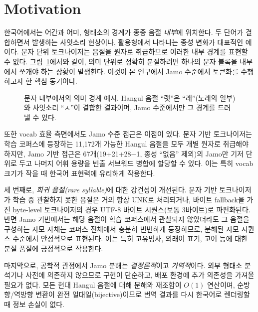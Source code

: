 \documentclass[sigconf,nonacm]{acmart}
\begin{document}
\section{Motivation}
\label{sec:motivation}

한국어에서는 어간과 어미, 형태소의 경계가 종종 음절 \emph{내부}에 위치한다. 두 단어가 결합하면서
발생하는 사잇소리 현상이나, 활용형에서 나타나는 종성 변화가 대표적인 예이다. 문자 단위
토크나이저는 음절을 원자로 취급하므로 이러한 내부 경계를 표현할 수 없다.
그림~\ref{fig:meaning_split}에서와 같이, 의미 단위로 정확히 분절하려면 하나의 문자 블록을
내부에서 쪼개야 하는 상황이 발생한다. 이것이 본 연구에서 Jamo 수준에서 토큰화를 수행하고자 한
핵심 동기이다.

\begin{figure}[h]
\centering
{}
\caption{문자 내부에서의 의미 경계 예시. Hangul 음절 ``랫''은 ``래''(노래의 일부)와 사잇소리 ``ㅅ''이
결합한 결과이며, Jamo 수준에서만 그 경계를 드러낼 수 있다.}
\label{fig:meaning_split}
\end{figure}

또한 vocab 효율 측면에서도 Jamo 수준 접근은 이점이 있다. 문자 기반 토크나이저는 학습 코퍼스에
등장하는 11,172개 가능한 Hangul 음절을 모두 개별 원자로 취급해야 하지만, Jamo 기반 접근은
67개(19+21+28$-$1, 종성 ``없음'' 제외)의 Jamo만 기저 단위로 두고 나머지 어휘 용량을
빈출 서브워드 병합에 할당할 수 있다. 이는 특히 vocab 크기가 작을 때 한국어 표현력에 유리하게 작용한다.

세 번째로, \emph{희귀 음절(rare syllable)}에 대한 강건성이 개선된다. 문자 기반 토크나이저가 학습 중
관찰하지 못한 음절은 거의 항상 UNK로 처리되거나, 바이트 fallback을 가진 byte-level 토크나이저의
경우 UTF-8 바이트 시퀀스(보통 3바이트)로 파편화된다. 반면 Jamo 기반에서는 해당 음절이
학습 코퍼스에서 관찰되지 않았더라도 그 음절을 구성하는 자모 자체는 코퍼스 전체에서 충분히
빈번하게 등장하므로, 분해된 자모 시퀀스 수준에서 안정적으로 표현된다. 이는 특히 고유명사,
외래어 표기, 고어 등에 대한 분절 품질에 긍정적으로 작용한다.

마지막으로, 공학적 관점에서 Jamo 분해는 \emph{결정론적}이고 \emph{가역적}이다. 외부 형태소 분석기나
사전에 의존하지 않으므로 구현이 단순하고, 배포 환경에 추가 의존성을 가져올 필요가 없다.
모든 현대 Hangul 음절에 대해 분해와 재조합이 $O(1)$ 연산이며, 순방향/역방향 변환이
완전 일대일(bijective)이므로 번역 결과를 다시 한국어로 렌더링할 때 정보 손실이 없다.
\end{document}
